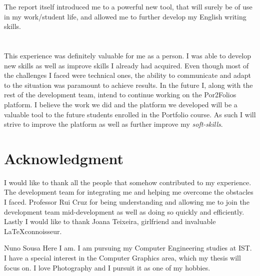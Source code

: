 \documentclass[a4paper,12pt,journal,twoside,compsoc]{PPIEEEtran}
\begin{document}
The report itself introduced me to a powerful new tool, that will surely be of use in my work/student  life, and allowed me to further develop my English writing skills. 



\section{}
This experience was definitely valuable for me as a person. I was able to develop new skills as well as improve skills I already had acquired. Even though most of the challenges I faced were technical ones, the ability to communicate and adapt to the situation was paramount to achieve results.  In the future I, along with the rest of the development team, intend to continue working on the Por2Folios platform. I believe the work we did and the platform we developed will be a valuable tool to the future students enrolled in the Portfolio course. As such I will strive to improve the platform as well as further improve my \textit{soft-skills}. 
\ifCLASSOPTIONcompsoc
  \section*{} %
\else
  \section*{Acknowledgment}
\fi

I would like to thank all the people that somehow contributed to my experience. The development team for integrating me and helping me overcome the obstacles I faced. Professor Rui Cruz for being understanding and allowing me to join the development team mid-development as well as doing so quickly and efficiently. Lastly I would like to thank Joana Teixeira, girlfriend and invaluable \LaTeX connoisseur.

% 
\begin{IEEEbiography}{Nuno Sousa}
Here I am. I am pursuing my Computer Engineering studies at \ac{IST}. I have a special interest in the Computer Graphics area, which my thesis will focus on. I love Photography and I pursuit it as one of my hobbies.
\end{IEEEbiography}
\end{document}
